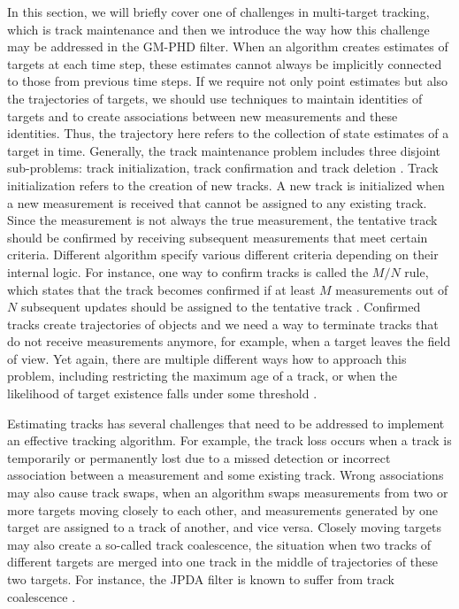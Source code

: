 In this section, we will briefly cover one of challenges in multi-target tracking, which is track maintenance and then we introduce the way how this challenge may be addressed in the GM-PHD filter. When an algorithm creates estimates of targets at each time step, these estimates cannot always be implicitly connected to those from previous time steps. If we require not only point estimates but also the trajectories of targets, we should use techniques to maintain identities of targets and to create associations between new measurements and these identities. Thus, the trajectory here refers to the collection of state estimates of a target in time. Generally, the track maintenance problem includes three disjoint sub-problems: track initialization, track confirmation and track deletion \cite{blackmanDesignAnalysisModern1999}. Track initialization refers to the creation of new tracks. A new track is initialized when a new measurement is received that cannot be assigned to any existing track. Since the measurement is not always the true measurement, the tentative track should be confirmed by receiving subsequent measurements that meet certain criteria. Different algorithm specify various different criteria depending on their internal logic. For instance, one way to confirm tracks is called the $M/N$ rule, which states that the track becomes confirmed if at least $M$ measurements out of $N$ subsequent updates should be assigned to the tentative track \cite[871]{blackmanDesignAnalysisModern1999}. Confirmed tracks create trajectories of objects and we need a way to terminate tracks that do not receive measurements anymore, for example, when a target leaves the field of view. Yet again, there are multiple different ways how to approach this problem, including restricting the maximum age of a track, or when the likelihood of target existence falls under some threshold \cite[243]{challaFundamentalsObjectTracking2011}.

Estimating tracks has several challenges that need to be addressed to implement an effective tracking algorithm. For example, the track loss occurs when a track is temporarily or permanently lost due to a missed detection or incorrect association between a measurement and some existing track. Wrong associations may also cause track swaps, when an algorithm swaps measurements from two or more targets moving closely to each other, and measurements generated by one target are assigned to a track of another, and vice versa. Closely moving targets may also create a so-called track coalescence, the situation when two tracks of different targets are merged into one track in the middle of trajectories of these two targets. For instance, the JPDA filter is known to suffer from track coalescence \cite{kropfreiterTrackCoalescenceRepulsion2021}.

